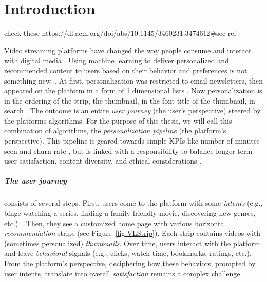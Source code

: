 
\chapter{Introduction}
\label{chapter:introduction}


check these https://dl.acm.org/doi/abs/10.1145/3460231.3474612\#sec-ref \tocite{}

Video streaming platforms have changed the way people consume and interact with digital media \tocite{}. Using machine learning to deliver personalized and recommended content to users based on their behavior and preferences is not something new~\cite{oldPersonalizationBehavior, oldPersonalizationSearch}. At first, personalization was restricted to email newsletters, then appeared on the platform in a form of 1 dimensional lists \tocite{}. Now personalization is in the ordering of the strip, the thumbnail, in the font title of the thumbnail, in search \tocite{}. The outcome is an entire \emph{user journey} (the user's perspective) steered by the platforms algorithms. For the purpose of this thesis, we will call this combination of algorithms, the \emph{personalization pipeline} (the platform's perspective). This pipeline is geared towards simple KPIs like number of minutes seen \tocite{} and churn rate \tocite{}, but is linked with a responsibility to balance longer term user satisfaction, content diversity, and ethical considerations \tocite{}.

\paragraph{The user journey} consists of several steps. First, users come to the platform with some \emph{intents} (e.g., binge-watching a series, finding a family-friendly movie, discovering new genres, etc.)~\cite{intent}. Then, they see a customized home page with various horizontal \emph{recommendation} strips (see Figure~\ref{fig:VLStrip}). Each strip contains videos with (sometimes personalized) \emph{thumbnails}. Over time, users interact with the platform and leave \emph{behavioral} signals (e.g., clicks, watch time, bookmarks, ratings, etc.). From the platform's perspective, deciphering how these behaviors, prompted by user intents, translate into overall \emph{satisfaction} remains a complex challenge. 

